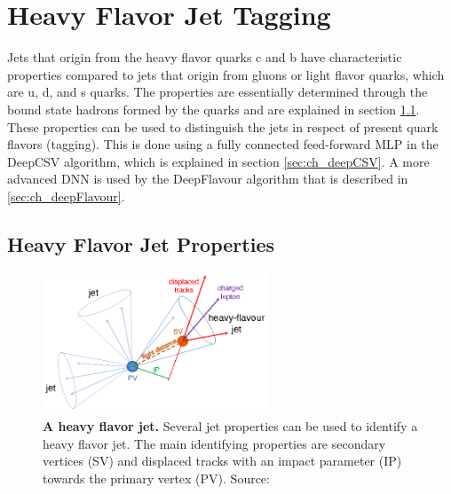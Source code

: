 \chapter{Heavy Flavor Jet Tagging}
Jets that origin from the heavy flavor quarks c and b have characteristic properties compared to jets that origin from gluons or light flavor quarks, which are u, d, and s quarks. The properties are essentially determined through the bound state hadrons formed by the quarks and are explained in section \ref{sec:ch_tag_properties}. These properties can be used to distinguish the jets in respect of present quark flavors (tagging). This is done using a fully connected feed-forward MLP in the DeepCSV algorithm, which is explained in section \ref{sec:ch_deepCSV}. A more advanced DNN is used by the DeepFlavour algorithm that is described in \ref{sec:ch_deepFlavour}.

\section{Heavy Flavor Jet Properties}\label{sec:ch_tag_properties}
\begin{figure}
\centering
\includegraphics[width=0.6\textwidth]{assets/SV.png}
\caption[Heavy Flavor Jet]{\textbf{A heavy flavor jet.} Several jet properties can be used to identify a heavy flavor jet. The main identifying properties are secondary vertices (SV) and displaced tracks with an impact parameter (IP) towards the primary vertex (PV).  Source: \cite{HeavyFlavorIdentification}}
\label{fig:ch_5_SV}
\end{figure}

